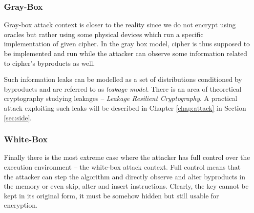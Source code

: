 \subsubsection{Gray-Box}

Gray-box attack context is closer to the reality since we do not encrypt using oracles but rather using some physical devices which run a specific implementation of given cipher. In the gray box model, cipher is thus supposed to be implemented and run while the attacker can observe some information related to cipher's byproducts as well.

Such information leaks can be modelled as a set of distributions conditioned by byproducts and are referred to as {\em leakage model}. There is an area of theoretical cryptography studying leakages -- {\em Leakage Resilient Cryptography}. A practical attack exploiting such leaks will be described in Chapter \ref{chap:attack} in Section \ref{sec:side}.   %

\subsubsection{White-Box}

Finally there is the most extreme case where the attacker has full control over the execution environment -- the white-box attack context. Full control means that the attacker can step the algorithm and directly observe and alter byproducts in the memory or even skip, alter and insert instructions. Clearly, the key cannot be kept in its original form, it must be somehow hidden but still usable for encryption.
